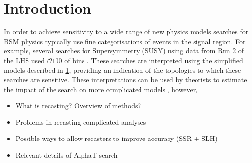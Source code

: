 \section{Introduction}
\label{sec:intro}
In order to achieve sensitivity to a wide range of new physics models searches
for BSM physics typically use fine categorisations of events in the signal region.
For example, several searches for Supersymmetry (SUSY) using data from Run 2 of the LHS
used $\mathcal{O}100$ of bins \cite{susy-searches}. These searches are interpreted 
using the simplified models described in \ref{sec:intro}, providing an indication
of the topologies to which these searches are sensitive. These interpretations can 
be used by theorists to estimate the impact of the search on more complicated models 
\cite{usingSimpForModels}, however, 

\begin{itemize}
\item What is recasting? Overview of methods?
\item Problems in recasting complicated analyses
\item Possible ways to allow recasters to improve accuracy (SSR + SLH)
\item Relevant details of AlphaT search
\end{itemize}



